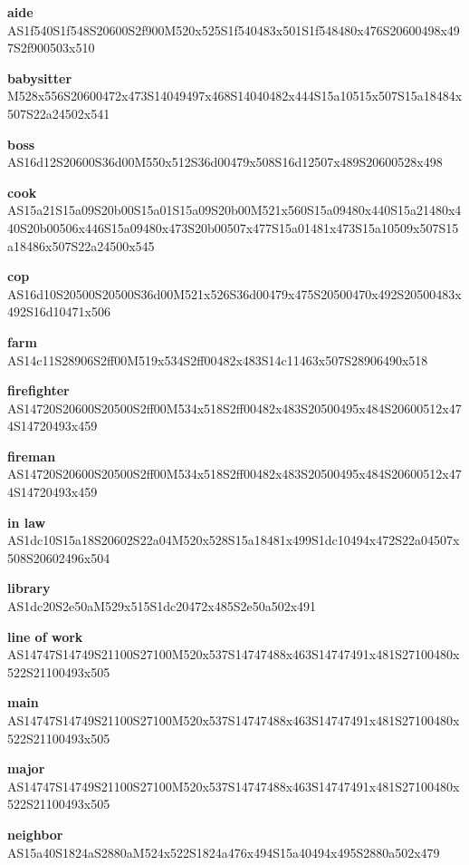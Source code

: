 \documentclass{article}
\begin{document}
\begin{glossary}
 
\textbf{aide}\\
AS1f540S1f548S20600S2f900M520x525S1f540483x501S1f548480x476S20600498x497S2f900503x510

\textbf{babysitter}\\
M528x556S20600472x473S14049497x468S14040482x444S15a10515x507S15a18484x507S22a24502x541

\textbf{boss}\\
AS16d12S20600S36d00M550x512S36d00479x508S16d12507x489S20600528x498

\textbf{cook}\\
AS15a21S15a09S20b00S15a01S15a09S20b00M521x560S15a09480x440S15a21480x440S20b00506x446S15a09480x473S20b00507x477S15a01481x473S15a10509x507S15a18486x507S22a24500x545

\textbf{cop}\\
AS16d10S20500S20500S36d00M521x526S36d00479x475S20500470x492S20500483x492S16d10471x506

\textbf{farm}\\
AS14c11S28906S2ff00M519x534S2ff00482x483S14c11463x507S28906490x518

\textbf{firefighter}\\
AS14720S20600S20500S2ff00M534x518S2ff00482x483S20500495x484S20600512x474S14720493x459

\textbf{fireman}\\
AS14720S20600S20500S2ff00M534x518S2ff00482x483S20500495x484S20600512x474S14720493x459

\textbf{in law}\\
AS1dc10S15a18S20602S22a04M520x528S15a18481x499S1dc10494x472S22a04507x508S20602496x504

\textbf{library}\\
AS1dc20S2e50aM529x515S1dc20472x485S2e50a502x491

\textbf{line of work}\\
AS14747S14749S21100S27100M520x537S14747488x463S14747491x481S27100480x522S21100493x505

\textbf{main}\\
AS14747S14749S21100S27100M520x537S14747488x463S14747491x481S27100480x522S21100493x505

\textbf{major}\\
AS14747S14749S21100S27100M520x537S14747488x463S14747491x481S27100480x522S21100493x505

\textbf{neighbor}\\
AS15a40S1824aS2880aM524x522S1824a476x494S15a40494x495S2880a502x479


\end{glossary}
\end{document}
